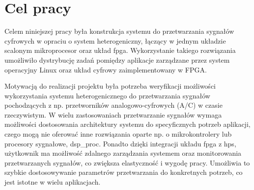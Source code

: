 
\section*{Cel pracy}
\label{sec:cel_pracy}

Celem niniejszej pracy była konstrukcja systemu do przetwarzania sygnałów cyfrowych w opraciu o system heterogeniczny, łączący w jednym układzie scalonym mikroprocesor  oraz układ \ac{fpga}. Wykorzystanie takiego rozwiązania umożliwiło dystrybucję zadań pomiędzy aplikacje zarządzane przez system operacyjny Linux oraz układ cyfrowy zaimplementowany w FPGA.

Motywacją do realizacji projektu była potrzeba weryfikacji możliwości wykorzystania systemu heterogenicznego do przetwarzania sygnałów pochodzących z np. przetworników analogowo-cyfrowych (A/C) w czasie rzeczywistym. W wielu zastosowaniach przetwarzanie sygnałów wymaga możliwości dostosowania architektury systemu do specyficznych potrzeb aplikacji, czego mogą nie oferować inne rozwiązania oparte np. o mikrokontrolery lub procesory sygnałowe, \ac{dsp_proc}. Ponadto dzięki integracji  układu \ac{fpga} z \ac{hps}, użytkownik ma możliwość zdalnego zarządzania systemem oraz monitorowania przetwarzanych sygnałów, co zwiększa elastyczność i wygodę pracy. Umożliwia to szybkie dostosowywanie parametrów przetwarzania do konkretnych potrzeb, co jest istotne w wielu aplikacjach.

